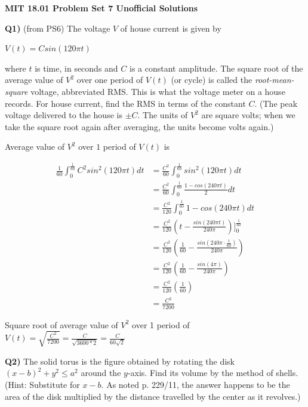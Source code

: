 \documentclass[9pt]{article}
\begin{document}
\begin{center}
  \large\textbf{MIT 18.01 Problem Set 7 Unofficial Solutions}
\end{center}

\begin{tcolorbox}
  \textbf{Q1)} (from PS6) The voltage $V$ of house current is given by\\
  \begin{center}
    $V(t) = Csin(120\pi t)$
  \end{center}
  \begin{center}
  \end{center}
  where $t$ is time, in seconds and $C$ is a constant amplitude. The square root of the average value of $V^2$ over one period of $V(t)$ (or cycle) is called the \emph{root-mean-square} voltage, abbreviated RMS. This is what the voltage meter on a house records. For house current, find the RMS in terms of the constant $C$. (The peak voltage delivered to the house is $\pm C$. The units of $V^2$ are square volts; when we take the square root again after averaging, the units become volts again.)
\end{tcolorbox}

Average value of $V^2$ over $1$ period of $V(t)$ is

\begin{align*}
  \frac{1}{60} \int_0^{\frac{1}{60}} C^2 sin^2(120\pi t) dt &= \frac{C^2}{60} \int_0^{\frac{1}{60}} sin^2(120\pi t) dt \\
  &= \frac{C^2}{60} \int_0^{\frac{1}{60}} \frac{1 - cos(240\pi t)}{2} dt \\
  &= \frac{C^2}{120} \int_0^{\frac{1}{60}} 1 - cos(240\pi t) dt \\
  &= \frac{C^2}{120} (t - \frac{sin(240\pi t)}{240\pi}) \bigg]_0^{\frac{1}{60}} \\
  &= \frac{C^2}{120} (\frac{1}{60} - \frac{sin(240\pi \cdot \frac{1}{60})}{240\pi}) \\
  &= \frac{C^2}{120} (\frac{1}{60} - \frac{sin(4\pi)}{240\pi}) \\
  &= \frac{C^2}{120} (\frac{1}{60}) \\
  &= \frac{C^2}{7200}
\end{align*}

Square root of average value of $V^2$ over 1 period of $V(t) = \sqrt{\frac{C^2}{7200}} = \frac{C}{\sqrt{3600 * 2}} = \frac{C}{60\sqrt{2}}$


\begin{tcolorbox}
  \textbf{Q2)} The solid torus is the figure obtained by rotating the disk $(x - b)^2 + y^2 \leq a^2$ around the $y$-axis. Find its volume by the method of shells. (Hint: Substitute for $x - b$. As noted p. 229/11, the answer happens to be the area of the disk multiplied by the distance travelled by the center as it revolves.)
\end{tcolorbox}
\end{document}
